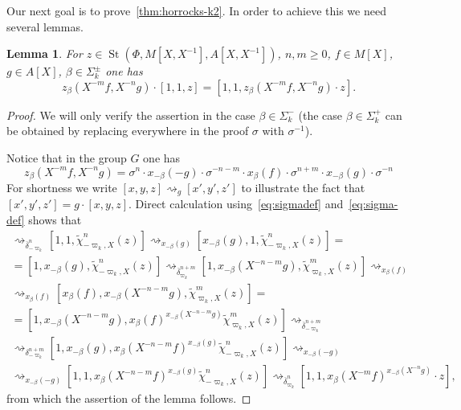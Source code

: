 \documentclass[oneside, 10pt]{amsart}
\DeclareMathOperator{\St}{St}
\newcommand{\inv}{^{-1}}
\numberwithin{equation}{section}
\numberwithin{thm}{section}
\newtheorem{lemma}[thm]{Lemma}
\numberwithin{lemma}{section}
\theoremstyle{definition}
\theoremstyle{remark}
\begin{document}
Our next goal is to prove~\cref{thm:horrocks-k2}.
In order to achieve this we need several lemmas.

\begin{lemma} \label{lem:family1}
For $z \in \St(\Phi, M[X, X\inv], A[X, X\inv])$, $n, m \geq 0$, $f \in M[X]$, $g \in A[X]$, $\beta \in \Sigma_k^\pm$ one has
\[ z_\beta(X^{-m}f, X^{-n}g) \cdot [1, 1, z] =  [1, 1, z_\beta(X^{-m}f, X^{-n}g) \cdot z].\]
\end{lemma}
\begin{proof}
We will only verify the assertion in the case $\beta \in \Sigma_k^-$
(the case $\beta \in \Sigma_k^+$ can be obtained by replacing everywhere in the proof $\sigma$ with $\sigma^{-1}$).

Notice that in the group $G$ one has
\begin{equation} z_\beta(X^{-m}f, X^{-n}g) =
\sigma^n \cdot x_{-\beta}(-g) \cdot \sigma^{-n-m} \cdot x_{\beta}(f) \cdot \sigma^{n + m} \cdot x_{-\beta}(g) \cdot \sigma^{-n} \end{equation}
For shortness we write $[x, y, z] \rightsquigarrow_{g} [x', y', z']$ to illustrate the fact that
$[x', y', z'] = g \cdot [x, y, z]$.
Direct calculation using~\eqref{eq:sigmadef} and~\eqref{eq:sigma-def} shows that
\begin{multline*}
[1, 1, z] \rightsquigarrow_{\overline{\delta}_{-\varpi_k}^n}
[1, 1, \widetilde{\chi}^n_{-\varpi_k, X}(z)] \rightsquigarrow_{x_{-\beta}(g)}
[x_{-\beta}(g), 1, \widetilde{\chi}_{-\varpi_k, X}^n(z)] = \\
= [1, x_{-\beta}(g), \widetilde{\chi}^n_{-\varpi_k, X}(z)] \rightsquigarrow_{\overline{\delta}_{\varpi_k}^{n + m}}
[1, x_{-\beta}(X^{-n-m}g), \widetilde{\chi}^m_{\varpi_k, X}(z)] \rightsquigarrow_{ x_{\beta}(f) } \\
\rightsquigarrow_{ x_{\beta}(f) } [x_{\beta}(f), x_{-\beta}(X^{-n-m}g), \widetilde{\chi}^m_{\varpi_k, X}(z)] = \\
= [1, x_{-\beta}(X^{-n-m}g), x_{\beta}(f)^{x_{-\beta}(X^{-n-m}g)} \widetilde{\chi}^m_{\varpi_k, X}(z)] \rightsquigarrow_{\overline{\delta}^{n + m}_{-\varpi_k}} \\
\rightsquigarrow_{\delta_{-\varpi_k}^{n + m}} [1, x_{-\beta}(g), x_{\beta}(X^{-n-m}f)^{x_{-\beta}(g)} \widetilde{\chi}^n_{-\varpi_k, X}(z)] \rightsquigarrow_{ x_{-\beta}(-g) } \\
\rightsquigarrow_{ x_{-\beta}(-g) } [1, 1, x_{\beta}(X^{-n-m}f)^{x_{-\beta}(g)} \widetilde{\chi}^n_{-\varpi_k, X}(z)] \rightsquigarrow_{ \overline{\delta}_{\varpi_k}^n }
[1, 1, x_{\beta}(X^{-m}f)^{x_{-\beta}(X^{-n}g)} \cdot z],
\end{multline*}
from which the assertion of the lemma follows.
\end{proof}
\end{document}
